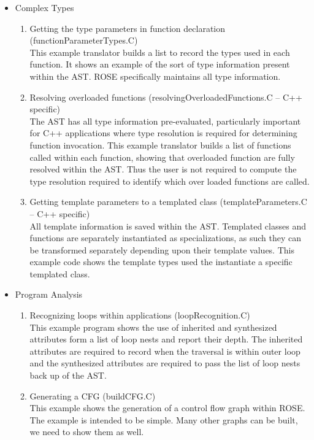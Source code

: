 \begin{itemize}
  \item{Complex Types} 
        \begin{enumerate}
     \item Getting the type parameters in function declaration (functionParameterTypes.C) \\
           This example translator builds a list to record the types used in each
           function.  It shows an example of the sort of type information present 
           within the AST.  ROSE specifically maintains all type information.

     \item Resolving overloaded functions (resolvingOverloadedFunctions.C -- C++ specific) \\
           The AST has all type information pre-evaluated, particularly important for C++
           applications where type resolution is required for determining function
           invocation. This example translator builds a list of functions called within
           each function, showing that overloaded function are fully resolved within the
           AST.  Thus the user is not required to compute the type resolution required
           to identify which over loaded functions are called.

     \item Getting template parameters to a templated class (templateParameters.C -- C++ specific) \\
           All template information is saved within the AST.  Templated classes and
           functions are separately instantiated as specializations, as such they
           can be transformed separately depending upon their template values.
           This example code shows the template types used the instantiate a specific
           templated class.

        \end{enumerate}

  \item{Program Analysis} 
        \begin{enumerate}
     \item Recognizing loops within applications (loopRecognition.C) \\
           This example program shows the use of inherited and synthesized attributes
           form a list of loop nests and report their depth.  The inherited attributes are
           required to record when the traversal is within outer loop and the synthesized 
           attributes are required to pass the list of loop nests back up of the AST.
     \item Generating a CFG (buildCFG.C) \\
           This example shows the generation of a control flow graph 
           within ROSE.  The example is intended to be simple.  Many other
           graphs can be built, we need to show them as well.


\end{enumerate}
\end{itemize}
